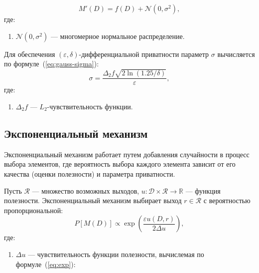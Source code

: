 \begin{equation}\label{eq:gauss-norm}
	M'(D) = f(D) + \mathcal{N}(0, \sigma^2 ),
\end{equation}
где:
\begin{enumerate}[label*=---]
	\item $\mathcal{N}(0, \sigma^2)$ --- многомерное нормальное распределение.
\end{enumerate}


Для обеспечения $(\varepsilon, \delta)$-дифференциальной приватности параметр $\sigma$ вычисляется по формуле~(\ref{eq:gauss-sigma}):
\begin{equation}\label{eq:gauss-sigma}
	\sigma = \frac{\Delta_2 f \sqrt{2 \ln(1.25/\delta)}}{\varepsilon},
\end{equation}
где:
\begin{enumerate}[label*=---]
	\item $\Delta_2 f$ --- $L_2$-чувствительность функции.
\end{enumerate}



\subsection{Экспоненциальный механизм}

Экспоненциальный механизм работает путем добавления случайности в
процесс выбора элементов, где вероятность выбора каждого элемента зависит от его качества (оценки полезности) и параметра приватности.~\cite{db}

Пусть $\mathcal{R}$ --- множество возможных выходов, $u: \mathcal{D} \times \mathcal{R} \to \mathbb{R}$ --- функция полезности. Экспоненциальный механизм выбирает выход $r \in \mathcal{R}$ с вероятностью пропорциональной:
\begin{equation}\label{eq:exp-mech}
	P[M(D)] \propto \exp\left(\frac{\varepsilon u(D, r)}{2\Delta u}\right),
\end{equation}
где:
\begin{enumerate}[label*=---]
	\item $\Delta u$ --- чувствительность функции полезности, вычислемая по формуле~(\ref{eq:exp}):
\end{enumerate}

